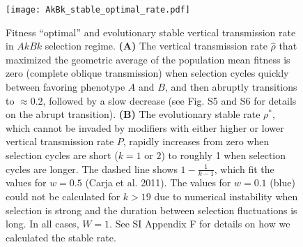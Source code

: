 \documentclass[9pt,twocolumn,twoside,lineno]{pnas-new}
\begin{document}
\begin{figure}[h]
\centering
\texttt{[image: AkBk\_stable\_optimal\_rate.pdf]}
\caption{Fitness ``optimal'' and evolutionary stable vertical transmission rate in $AkBk$ selection regime. 
\textbf{(A)} The vertical transmission rate $\hat{\rho}$ that maximized the geometric average of the population mean fitness is zero (complete oblique transmission) when selection cycles quickly between favoring phenotype $A$ and $B$, and then abruptly transitions to $\approx 0.2$, followed by a slow decrease (see Fig. S5 and S6 for details on the abrupt transition).
\textbf{(B)} The evolutionary stable rate $\rho^*$, which cannot be invaded by modifiers with either higher or lower vertical transmission rate $P$, rapidly increases from zero when selection cycles are short ($k=1$ or $2$) to roughly 1 when selection cycles are longer.
The dashed line shows $1-\frac{1}{k-1}$, which fit the values for $w=0.5$ (Carja et al. 2011). The values for $w=0.1$ (blue) could not be calculated for $k > 19$ due to numerical instability when selection is strong and the duration between selection fluctuations is long.
In all cases, $W=1$. See SI Appendix F for details on how we calculated the stable rate.}\label{fig:AkBk_stable_optimal_rate}
\end{figure}
\end{document}
